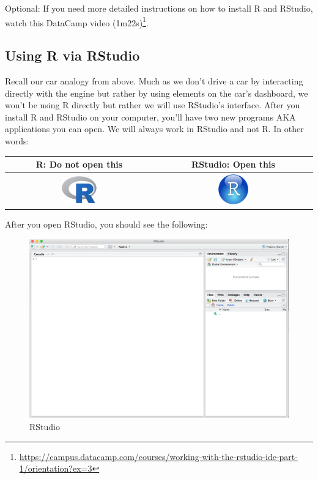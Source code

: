\documentclass[12pt,]{krantz}
\renewcommand{\href}[2]{#2\footnote{\url{#1}}}
\theoremstyle{definition}
\theoremstyle{definition}
\theoremstyle{definition}
\theoremstyle{remark}
\begin{document}
Optional: If you need more detailed instructions on how to install R and
RStudio, watch this
\href{https://campus.datacamp.com/courses/working-with-the-rstudio-ide-part-1/orientation?ex=3}{DataCamp
video (1m22s)}.

\subsection{Using R via RStudio}\label{using-r-via-rstudio}

Recall our car analogy from above. Much as we don't drive a car by
interacting directly with the engine but rather by using elements on the
car's dashboard, we won't be using R directly but rather we will use
RStudio's interface. After you install R and RStudio on your computer,
you'll have two new programs AKA applications you can open. We will
always work in RStudio and not R. In other words:

\begin{longtable}[]{@{}cc@{}}
\toprule
R: Do not open this & RStudio: Open this\tabularnewline
\midrule
\endhead
\includegraphics[width=0.25000\textwidth]{images/Rlogo.png} &
\includegraphics[width=0.20000\textwidth]{images/RStudio-Ball.png}\tabularnewline
\bottomrule
\end{longtable}

After you open RStudio, you should see the following:

\begin{figure}
\centering
\includegraphics{images/rstudio.png}
\caption{RStudio}
\end{figure}
\end{document}
